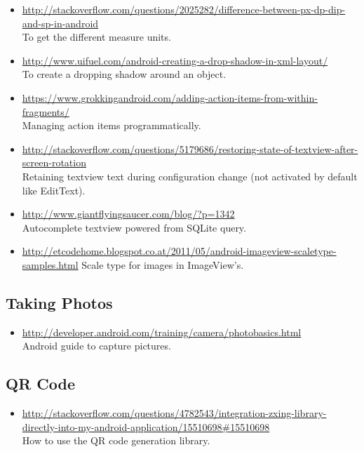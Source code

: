 \begin{itemize}
	\item \url{http://stackoverflow.com/questions/2025282/difference-between-px-dp-dip-and-sp-in-android} \\To get the different measure units.
	\item \url{http://www.uifuel.com/android-creating-a-drop-shadow-in-xml-layout/} \\To create a dropping shadow around an object.
	\item \url{https://www.grokkingandroid.com/adding-action-items-from-within-fragments/} \\Managing action items programmatically.
	\item \url{http://stackoverflow.com/questions/5179686/restoring-state-of-textview-after-screen-rotation} \\Retaining textview text during configuration change (not activated by default like EditText).
	\item \url{http://www.giantflyingsaucer.com/blog/?p=1342} \\Autocomplete textview powered from SQLite query.
	\item \url{http://etcodehome.blogspot.co.at/2011/05/android-imageview-scaletype-samples.html} Scale type for images in ImageView's.
\end{itemize}

\subsection{Taking Photos}

\begin{itemize}
	\item \url{http://developer.android.com/training/camera/photobasics.html}\\Android guide to capture pictures.
\end{itemize}

\subsection{QR Code}

\begin{itemize}
	\item \url{http://stackoverflow.com/questions/4782543/integration-zxing-library-directly-into-my-android-application/15510698#15510698} \\How to use the QR code generation library.
\end{itemize}

